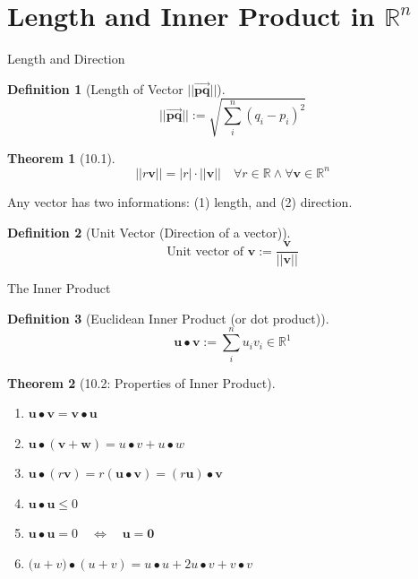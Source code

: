 \documentclass[a4paper,11pt]{article}
\newtheorem{defn}{Definition}
\newtheorem{thm}{Theorem}
\begin{document}

\section{Length and Inner Product in $\mathbb{R}^n$} %
\label{sec:length_and_inner_product_in_mathbb_r_n}
\begin{frame}[t]{Length and Direction}
	\begin{defn}
		[Length of Vector $||\overrightarrow{\mathbf{pq}}||$]
		\[
			||\mathbf{\overrightarrow{pq}}|| := \sqrt{\sum_i^n (q_i-p_i)^2}
		\]
	\end{defn}
	\begin{thm}
		[10.1]\[
			||r\mathbf{v}||=|r|\cdot||\mathbf{v}|| \quad \forall r\in \mathbb{R}\land \forall\mathbf{v}\in\mathbb{R}^n
		\]
	\end{thm}
	Any vector has two informations: (1) length, and  (2) direction. 
	\begin{defn}
		[Unit Vector (Direction of a vector)]
		\[
		\text{Unit vector of }\mathbf{v}:=\frac{\mathbf{v}}{||\mathbf{v}||}
		\]
	\end{defn}
\end{frame}

\begin{frame}[t]{The Inner Product}
	\begin{defn}
		[Euclidean Inner Product (or dot product)]
		\[
			\mathbf{u}\bullet\mathbf{v}:=\sum_i^n u_iv_i \in \mathbb{R}^1
		\]
	\end{defn}
	\begin{thm}
		[10.2: Properties of Inner Product]\begin{enumerate}
			\item $\mathbf{u\bullet v}=\mathbf{v\bullet u}$
			\item $\mathbf{u\bullet(v+w)}=u\bullet v + u\bullet w$
			\item $\mathbf{u}\bullet(r\mathbf{v})=r(\mathbf{u\bullet v})=(r\mathbf{u})\bullet\mathbf{v}$
			\item $\mathbf{u\bullet u}\le 0$
			\item $\mathbf{u\bullet u}=0\quad\iff\quad \mathbf{u}=\mathbf{0}$ 
			\item $\mathbf(u+v)\bullet(u+v)=u\bullet u + 2 u\bullet v + v\bullet v$
		\end{enumerate}
	\end{thm}
\end{frame}
\end{document}
